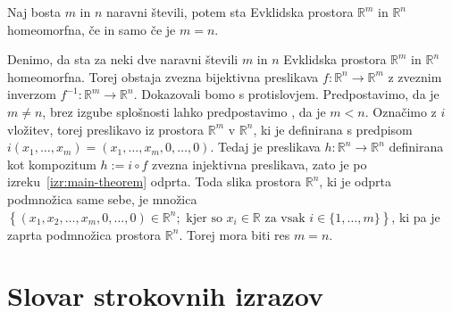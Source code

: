 \documentclass[mat1]{fmfdelo}
\newcommand{\literatura}{literatura}  %
\newcommand{\R}{\mathbb R}
\newcommand{\0}{\underline{0}}
\begin{document}
\begin{izrek}\label{izr:dim_izr}
Naj bosta $m$ in $n$ naravni števili, potem sta Evklidska prostora $\R^m$ in $\R^n$ homeomorfna, če in samo če je $m = n$.
\end{izrek}

\begin{dokaz}
Denimo, da sta za neki dve naravni števili $m$ in $n$ Evklidska prostora $\R^m$ in $\R^n$ homeomorfna. Torej obstaja zvezna bijektivna preslikava $f : \R^n \to \R^m$ z zveznim inverzom $f^{-1} : \R^m \to \R^n$. Dokazovali bomo s protislovjem. Predpostavimo, da je $m \neq n$, brez izgube splošnosti lahko predpostavimo , da je $m < n$. Označimo z $i$ vložitev, torej preslikavo iz prostora $\R^m$ v $\R^n$, ki je definirana s predpisom $i(x_1, \dots, x_m) = (x_1, \dots, x_m, 0, \dots, 0)$. Tedaj je preslikava $h : \R^n \to \R^n$ definirana kot kompozitum $h := i \circ f$ zvezna injektivna preslikava, zato je po izreku~\ref{izr:main-theorem} odprta. Toda slika prostora $\R^n$, ki je odprta podmnožica same sebe, je množica $\left \{ (x_1, x_2, \dots, x_m, 0, \dots, 0) \in \R^n ; \text{ kjer so } x_i \in \R \text{ za vsak } i \in \{1, \dots, m \}  \right \}$, ki pa je zaprta podmnožica prostora $\R^n$. Torej mora biti res $m = n$.
\end{dokaz}


\cite{Kulpa}
\cite{Dauben1975}
\cite{convexhull}
\cite{Ahlbach}


\section*{Slovar strokovnih izrazov}

\geslo{}{}
\geslo{}{}

        
\end{document}
